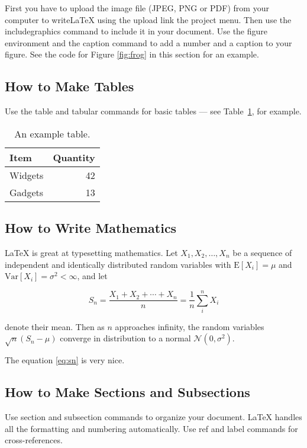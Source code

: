 \documentclass[a4paper]{article}
\begin{document}
First you have to upload the image file (JPEG, PNG or PDF) from your computer to writeLaTeX using the upload link the project menu. Then use the includegraphics command to include it in your document. Use the figure environment and the caption command to add a number and a caption to your figure. See the code for Figure \ref{fig:frog} in this section for an example.



\subsection{How to Make Tables}

Use the table and tabular commands for basic tables --- see Table~\ref{tab:widgets}, for example.

\begin{table}
\centering
\begin{tabular}{l|r}
Item & Quantity \\\hline
Widgets & 42 \\
Gadgets & 13
\end{tabular}
\caption{\label{tab:widgets}An example table.}
\end{table}

\subsection{How to Write Mathematics}

\LaTeX{} is great at typesetting mathematics. Let $X_1, X_2, \ldots, X_n$ be a sequence of independent and identically distributed random variables with $\text{E}[X_i] = \mu$ and $\text{Var}[X_i] = \sigma^2 < \infty$, and let

\begin{equation}
S_n = \frac{X_1 + X_2 + \cdots + X_n}{n}
      = \frac{1}{n}\sum_{i}^{n} X_i
\label{eq:sn}
\end{equation}

denote their mean. Then as $n$ approaches infinity, the random variables $\sqrt{n}(S_n - \mu)$ converge in distribution to a normal $\mathcal{N}(0, \sigma^2)$.

The equation \ref{eq:sn} is very nice.

\subsection{How to Make Sections and Subsections}

Use section and subsection commands to organize your document. \LaTeX{} handles all the formatting and numbering automatically. Use ref and label commands for cross-references.
\end{document}
